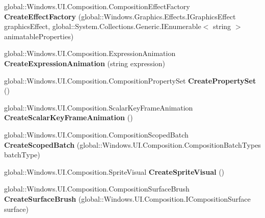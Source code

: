 \begin{DoxyCompactItemize}
global\+::\+Windows.\+U\+I.\+Composition.\+Composition\+Effect\+Factory {\bfseries Create\+Effect\+Factory} (global\+::\+Windows.\+Graphics.\+Effects.\+I\+Graphics\+Effect graphics\+Effect, global\+::\+System.\+Collections.\+Generic.\+I\+Enumerable$<$ string $>$ animatable\+Properties)
\item 
\mbox{\label{class_windows_1_1_u_i_1_1_composition_1_1_compositor_ae872b8e5d7605ff92461b38237f26bcf}} 
global\+::\+Windows.\+U\+I.\+Composition.\+Expression\+Animation {\bfseries Create\+Expression\+Animation} (string expression)
\item 
\mbox{\label{class_windows_1_1_u_i_1_1_composition_1_1_compositor_a74091487764434fe783ce2e35bc897d2}} 
global\+::\+Windows.\+U\+I.\+Composition.\+Composition\+Property\+Set {\bfseries Create\+Property\+Set} ()
\item 
\mbox{\label{class_windows_1_1_u_i_1_1_composition_1_1_compositor_a1c091ff2583caeef8359702f57a8ee0d}} 
global\+::\+Windows.\+U\+I.\+Composition.\+Scalar\+Key\+Frame\+Animation {\bfseries Create\+Scalar\+Key\+Frame\+Animation} ()
\item 
\mbox{\label{class_windows_1_1_u_i_1_1_composition_1_1_compositor_a7ffb728cfd21a486270b346127894097}} 
global\+::\+Windows.\+U\+I.\+Composition.\+Composition\+Scoped\+Batch {\bfseries Create\+Scoped\+Batch} (global\+::\+Windows.\+U\+I.\+Composition.\+Composition\+Batch\+Types batch\+Type)
\item 
\mbox{\label{class_windows_1_1_u_i_1_1_composition_1_1_compositor_a74d76a5f9c181cabe102c81e114500ca}} 
global\+::\+Windows.\+U\+I.\+Composition.\+Sprite\+Visual {\bfseries Create\+Sprite\+Visual} ()
\item 
\mbox{\label{class_windows_1_1_u_i_1_1_composition_1_1_compositor_a281e5812822cbd2bb26434f086f15fc2}} 
global\+::\+Windows.\+U\+I.\+Composition.\+Composition\+Surface\+Brush {\bfseries Create\+Surface\+Brush} (global\+::\+Windows.\+U\+I.\+Composition.\+I\+Composition\+Surface surface)

\end{DoxyCompactItemize}

